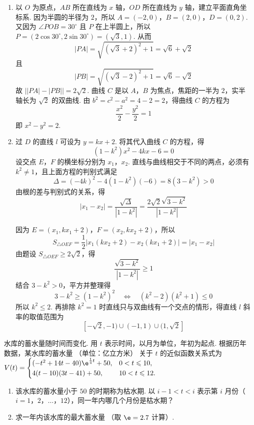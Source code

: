 \begin{solution}
\begin{enumerate}
\item 以 \(O\) 为原点，\(AB\) 所在直线为 \(x\) 轴，\(OD\) 所在直线为 \(y\) 轴，建立平面直角坐标系. 因为半圆的半径为 \(2\)，所以
\(A=(-2,0)\)，\(B=(2,0)\)，\(D=(0,2)\).
又因为 \(\angle POB=30^{\circ}\) 且 \(P\) 在上半圆上，所以 \(P=(2\cos30^{\circ},2\sin30^{\circ})=(\sqrt{3},1)\). 从而
\[
|PA|=\sqrt{(\sqrt{3}+2)^2+1}=\sqrt{6}+\sqrt{2}
\]
且
\[
|PB|=\sqrt{(\sqrt{3}-2)^2+1}=\sqrt{6}-\sqrt{2}
\]
故 \(\left||PA|-|PB|\right|=2\sqrt{2}\). 曲线 \(C\) 是以 \(A\)，\(B\) 为焦点，焦距的一半为 \(2\)，实半轴长为 \(\sqrt{2}\) 的双曲线. 由 \(b^{2}=c^{2}-a^{2}=4-2=2\)，得曲线 \(C\) 的方程为
\[
\frac{x^{2}}{2}-\frac{y^{2}}{2}=1
\]
即 \(x^{2}-y^{2}=2\).

\item 过 \(D\) 的直线 \(l\) 可设为 \(y=kx+2\). 将其代入曲线 \(C\) 的方程，得
\[
(1-k^{2})x^{2}-4kx-6=0
\]
设交点 \(E\)，\(F\) 的横坐标分别为 \(x_{1}\)，\(x_{2}\). 直线与曲线相交于不同的两点，必须有 \(k^{2}\neq1\)，且上面方程的判别式满足
\[
\Delta=(-4k)^{2}-4(1-k^{2})(-6)=8(3-k^{2})>0
\]
由根的差与判别式的关系，得
\[
|x_{1}-x_{2}|=\frac{\sqrt{\Delta}}{|1-k^{2}|}=\frac{2\sqrt{2}\sqrt{3-k^{2}}}{|1-k^{2}|}
\]

因为 \(E=(x_{1},kx_{1}+2)\)，\(F=(x_{2},kx_{2}+2)\)，所以
\[
S_{\triangle OEF}=\frac12\left|x_{1}(kx_{2}+2)-x_{2}(kx_{1}+2)\right|=|x_{1}-x_{2}|
\]
由题设 \(S_{\triangle OEF}\geqslant2\sqrt{2}\)，得
\[
\frac{\sqrt{3-k^{2}}}{|1-k^{2}|}\geqslant1
\]
结合 \(3-k^{2}>0\)，平方并整理得
\[
3-k^{2}\geqslant(1-k^{2})^{2}\quad\Longleftrightarrow\quad (k^{2}-2)(k^{2}+1)\leqslant0
\]
所以 \(k^{2}\leqslant2\). 再排除 \(k^{2}=1\) 时直线只与双曲线有一个交点的情形，得直线 \(l\) 斜率的取值范围为
\[
[-\sqrt{2},-1)\cup(-1,1)\cup(1,\sqrt{2}]
\]
\end{enumerate}
\end{solution}

\begin{problem}
水库的蓄水量随时间而变化. 用 \(t\) 表示时间，以月为单位，年初为起点. 根据历年数据，某水库的蓄水量 （单位：亿立方米） 关于 \(t\) 的近似函数关系式为 \(V(t) = \begin{cases}
(-t^2 + 14t - 40)\e^{\frac14 t} + 50, & 0 < t \leqslant 10,\\
4(t - 10)(3t - 41) + 50, & 10 < t \leqslant 12.
\end{cases}\)
\begin{enumerate}
\item 该水库的蓄水量小于 \(50\) 的时期称为枯水期. 以 \(i-1<t<i\) 表示第 \(i\) 月份（\(i=1\)，\(2\)，\(\dots\)，\(12\)），同一年内哪几个月份是枯水期？
\item 求一年内该水库的最大蓄水量 （取 \(\e = 2.7\) 计算）.
\end{enumerate}
\end{problem}

